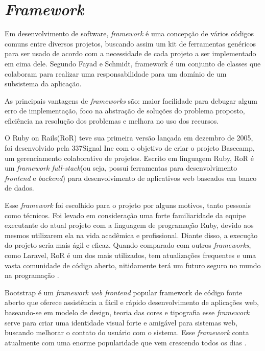 \section{\textit{Framework}}
Em desenvolvimento de software, \textit{framework} é uma concepção de vários códigos comuns entre diversos projetos, buscando assim um kit de ferramentas genéricos para ser usado de acordo com a necessidade de cada projeto a ser implementado em cima dele. Segundo Fayad e Schmidt, framework é um conjunto de classes que colaboram para realizar uma responsabilidade para um domínio de um subsistema da aplicação\cite{frameworkwikipedia}. \par
As principais vantagens de \textit{frameworks} são: maior facilidade para debugar algum erro de implementação, foco na abstração de soluções do problema proposto, eficiência na resolução dos problemas e melhora no uso dos recursos\cite{frameworkwikipedia}. \par
O Ruby on Rails(RoR) teve sua primeira versão lançada em dezembro de 2005, foi desenvolvido pela 337Signal Inc com o objetivo de criar o projeto Basecamp, um gerenciamento colaborativo de projetos. Escrito em linguagem Ruby, RoR é um \textit{framework full-stack}(ou seja, possui ferramentas para desenvolvimento \textit{frontend} e \textit{backend}) para desenvolvimento de aplicativos web baseados em banco de dados\cite{plekhanova2009evaluating}. \par
Esse \textit{framework} foi escolhido para o projeto por alguns motivos, tanto pessoais como técnicos. Foi levado em consideração uma forte familiaridade da equipe executante do atual projeto com a linguagem de programação Ruby, devido aos mesmos utilizarem ela na vida acadêmica e profissional. Diante disso, a execução do projeto seria mais ágil e eficaz. Quando comparado com outros \textit{frameworks}, como Laravel, RoR é um dos mais utilizados, tem atualizações frequentes e uma vasta comunidade de código aberto, nitidamente terá um futuro seguro no mundo na programação \cite{verma2014mvc}.

Bootstrap é um \textit{framework web frontend} popular framework de código fonte aberto que oferece assistência a fácil e rápido desenvolvimento de aplicações web, baseando-se em modelo de design, teoria das cores e tipografia esse \textit{framework} serve para criar uma identidade visual forte e amigável para sistemas web, buscando melhorar o contato do usuário com o sistema\cite{shah2015responsive}. Esse \textit{framework} conta atualmente com uma enorme popularidade que vem crescendo todos os dias \cite{jain2014review}. \par

